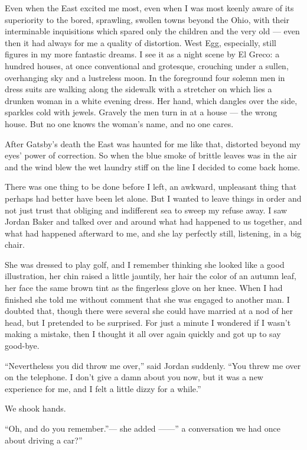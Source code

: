 \documentclass{znotebook}
\begin{document}
Even when the East excited me most, even when I was most keenly aware of its superiority to the bored, sprawling, swollen towns beyond the Ohio, with their interminable inquisitions which spared only the children and the very old — even then it had always for me a quality of distortion. West Egg, especially, still figures in my more fantastic dreams. I see it as a night scene by El Greco: a hundred houses, at once conventional and grotesque, crouching under a sullen, overhanging sky and a lustreless moon. In the foreground four solemn men in dress suits are walking along the sidewalk with a stretcher on which lies a drunken woman in a white evening dress. Her hand, which dangles over the side, sparkles cold with jewels. Gravely the men turn in at a house — the wrong house. But no one knows the woman’s name, and no one cares.

After Gatsby’s death the East was haunted for me like that, distorted beyond my eyes’ power of correction. So when the blue smoke of brittle leaves was in the air and the wind blew the wet laundry stiff on the line I decided to come back home.

There was one thing to be done before I left, an awkward, unpleasant thing that perhaps had better have been let alone. But I wanted to leave things in order and not just trust that obliging and indifferent sea to sweep my refuse away. I saw Jordan Baker and talked over and around what had happened to us together, and what had happened afterward to me, and she lay perfectly still, listening, in a big chair.

She was dressed to play golf, and I remember thinking she looked like a good illustration, her chin raised a little jauntily, her hair the color of an autumn leaf, her face the same brown tint as the fingerless glove on her knee. When I had finished she told me without comment that she was engaged to another man. I doubted that, though there were several she could have married at a nod of her head, but I pretended to be surprised. For just a minute I wondered if I wasn’t making a mistake, then I thought it all over again quickly and got up to say good-bye.

``Nevertheless you did throw me over,'' said Jordan suddenly. ``You threw me over on the telephone. I don’t give a damn about you now, but it was a new experience for me, and I felt a little dizzy for a while.''

We shook hands.

``Oh, and do you remember.''— she added ——'' a conversation we had once about driving a car?''
\end{document}
